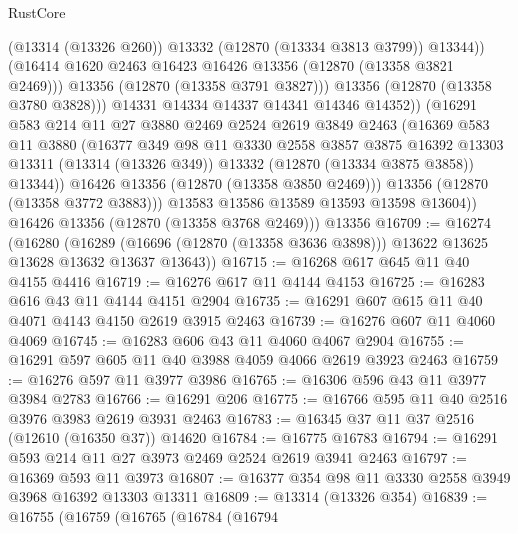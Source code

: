 \begin{lexlean}{RustCore}
\begin{coremodule}
                        (@13314 (@13326 @260))
                        @13332
                        (@12870 (@13334 @3813 @3799))
                        @13344))
                    (@16414 @1620 @2463 @16423 @16426 @13356 (@12870 (@13358 @3821 @2469)))
                    @13356
                    (@12870 (@13358 @3791 @3827)))
                  @13356
                  (@12870 (@13358 @3780 @3828)))
                @14331
                @14334
                @14337
                @14341
                @14346
                @14352))
            (@16291
              @583
              @214
              @11
              @27
              @3880
              @2469
              @2524
              @2619
              @3849
              @2463
              (@16369
                @583
                @11
                @3880
                (@16377
                  @349
                  @98
                  @11
                  @3330
                  @2558
                  @3857
                  @3875
                  @16392
                  @13303
                  @13311
                  (@13314 (@13326 @349))
                  @13332
                  (@12870 (@13334 @3875 @3858))
                  @13344))
              @16426
              @13356
              (@12870 (@13358 @3850 @2469)))
            @13356
            (@12870 (@13358 @3772 @3883)))
          @13583
          @13586
          @13589
          @13593
          @13598
          @13604))
      @16426
      @13356
      (@12870 (@13358 @3768 @2469)))
    @13356
@16709 := @16274
    (@16280
      (@16289 (@16696 (@12870 (@13358 @3636 @3898))) @13622 @13625 @13628 @13632 @13637 @13643))
@16715 := @16268 @617 @645 @11 @40 @4155 @4416
@16719 := @16276 @617 @11 @4144 @4153
@16725 := @16283 @616 @43 @11 @4144 @4151 @2904
@16735 := @16291 @607 @615 @11 @40 @4071 @4143 @4150 @2619 @3915 @2463
@16739 := @16276 @607 @11 @4060 @4069
@16745 := @16283 @606 @43 @11 @4060 @4067 @2904
@16755 := @16291 @597 @605 @11 @40 @3988 @4059 @4066 @2619 @3923 @2463
@16759 := @16276 @597 @11 @3977 @3986
@16765 := @16306 @596 @43 @11 @3977 @3984 @2783
@16766 := @16291 @206
@16775 := @16766 @595 @11 @40 @2516 @3976 @3983 @2619 @3931 @2463
@16783 := @16345 @37 @11 @37 @2516 (@12610 (@16350 @37)) @14620
@16784 := @16775 @16783
@16794 := @16291 @593 @214 @11 @27 @3973 @2469 @2524 @2619 @3941 @2463
@16797 := @16369 @593 @11 @3973
@16807 := @16377 @354 @98 @11 @3330 @2558 @3949 @3968 @16392 @13303 @13311
@16809 := @13314 (@13326 @354)
@16839 := @16755
    (@16759
      (@16765
        (@16784
          (@16794

\end{coremodule}
\end{lexlean}

